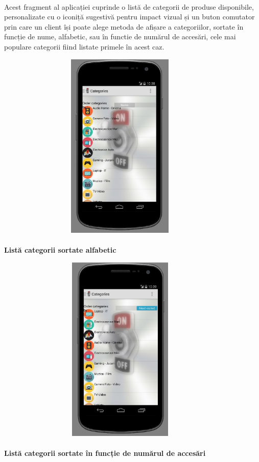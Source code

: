  \paragraph{ }Acest fragment al aplicației cuprinde o listă de categorii de produse disponibile, personalizate cu o iconiță sugestivă pentru impact vizual și un buton comutator prin care un client își poate alege metoda de afișare a categoriilor, sortate în funcție de nume, alfabetic, sau în functie de numărul de accesări, cele mai populare categorii fiind listate primele în acest caz.
\begin{center}
\includegraphics[width=12cm,height=9cm,keepaspectratio]{imagini/categorii.eps} %
\paragraph{}
\textbf{Listă categorii sortate alfabetic}
\end{center}

\begin{center}
\includegraphics[width=12cm,height=9cm,keepaspectratio]{imagini/catgorii2.eps} %
\paragraph{}
\textbf{Listă categorii sortate în funcție de numărul de accesări}
\end{center}

